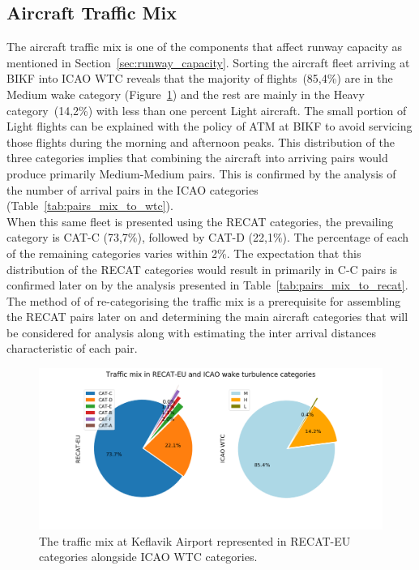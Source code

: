 \subsection{Aircraft Traffic Mix\label{ssec:traffic_mix}}
The aircraft traffic mix is one of the components that affect runway capacity as mentioned in Section~\ref{sec:runway_capacity}. Sorting the aircraft fleet arriving at BIKF into ICAO WTC reveals that the majority of flights~(85,4\%) are in the Medium wake category (Figure~\ref{fig:post_fast_exit_mix_pie_v2}) and the rest are mainly in the Heavy category~(14,2\%) with less than one percent Light aircraft. The small portion of Light flights can be explained with the policy of ATM at BIKF to avoid servicing those flights during the morning and afternoon peaks. This distribution of the three categories implies that combining the aircraft into arriving pairs would produce primarily Medium-Medium pairs. This is confirmed by the analysis of the number of arrival pairs in the ICAO categories (Table~\ref{tab:pairs_mix_to_wtc}).\\
When this same fleet is presented using the RECAT categories, the prevailing category is CAT-C (73,7\%), followed by CAT-D (22,1\%). The percentage of each of the remaining categories varies within 2\%. The expectation that this distribution of the RECAT categories would result in primarily in C-C pairs is confirmed later on by the analysis presented in Table~\ref{tab:pairs_mix_to_recat}. \\
The method of of re-categorising the traffic mix is a prerequisite for assembling the RECAT pairs later on and determining the main aircraft categories that will be considered for analysis along with estimating the inter arrival distances characteristic of each pair.
\begin{figure}[h]
    \centering
    \includegraphics[width=1\textwidth]{graphics/fig_post_fast_exit_mix_pie_v2.png}
    \caption[Traffic mix in RECAT-EU and ICAO WTC]{The traffic mix at Keflavik Airport represented in RECAT-EU categories alongside ICAO WTC categories.}
    \label{fig:post_fast_exit_mix_pie_v2}
\end{figure}
